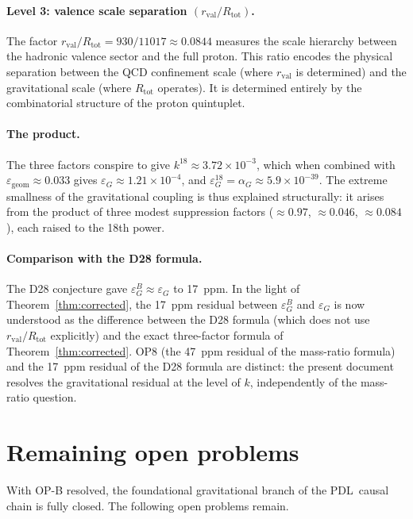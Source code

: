 \documentclass[12pt,a4paper]{article}
\theoremstyle{plain}
\theoremstyle{definition}
\theoremstyle{remark}
\newcommand{\PDL}{\textsc{PDL}}
\newcommand{\rval}{r_{\mathrm{val}}}
\newcommand{\Rtot}{R_{\mathrm{tot}}}
\newcommand{\egeom}{\varepsilon_{\mathrm{geom}}}
\newcommand{\eG}{\varepsilon_G}
\newcommand{\eGB}{\varepsilon_G^B}
\begin{document}
\paragraph{Level 3: valence scale separation $(\rval/\Rtot)$.} The factor $\rval/\Rtot = 930/11017 \approx 0.0844$ measures the scale hierarchy between the hadronic valence sector and the full proton. This ratio encodes the physical separation between the QCD confinement scale (where $\rval$ is determined) and the gravitational scale (where $\Rtot$ operates). It is determined entirely by the combinatorial structure of the proton quintuplet.

\paragraph{The product.} The three factors conspire to give $k^{18} \approx 3.72\times 10^{-3}$, which when combined with $\egeom \approx 0.033$ gives $\eG \approx 1.21\times 10^{-4}$, and $\eG^{18} = \alpha_G \approx 5.9\times 10^{-39}$. The extreme smallness of the gravitational coupling is thus explained structurally: it arises from the product of three modest suppression factors ($\approx 0.97$, $\approx 0.046$, $\approx 0.084$), each raised to the 18th power.

\paragraph{Comparison with the D28 formula.} The D28 conjecture \citep{D28} gave $\eGB \approx \eG$ to 17~ppm. In the light of Theorem~\ref{thm:corrected}, the 17~ppm residual between $\eGB$ and $\eG$ is now understood as the difference between the D28 formula (which does not use $\rval/\Rtot$ explicitly) and the exact three-factor formula of Theorem~\ref{thm:corrected}. OP8 (the 47~ppm residual of the mass-ratio formula) and the 17~ppm residual of the D28 formula are distinct: the present document resolves the gravitational residual at the level of $k$, independently of the mass-ratio question.

\section{Remaining open problems}
\label{sec:remaining}

With OP-B resolved, the foundational gravitational branch of the \PDL\ causal chain is fully closed. The following open problems remain.
\end{document}
